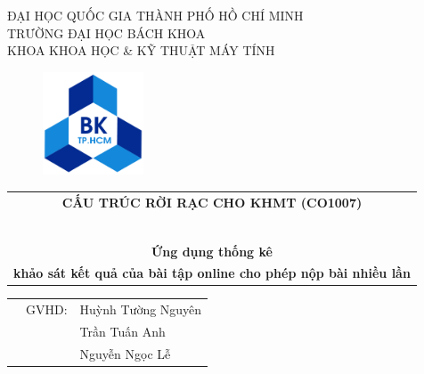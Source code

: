 \documentclass[a4paper]{article}
\theoremstyle{definition}
\begin{document}
\begin{titlepage}
\begin{center}
ĐẠI HỌC QUỐC GIA THÀNH PHỐ HỒ CHÍ MINH \\
TRƯỜNG ĐẠI HỌC BÁCH KHOA \\
KHOA KHOA HỌC \& KỸ THUẬT MÁY TÍNH 
\end{center}

\vspace{1cm}

\begin{figure}[h!]
\begin{center}
\includegraphics[width=3cm]{Images/hcmut.png}
\end{center}
\end{figure}

\vspace{1cm}


\begin{center}
\begin{tabular}{c}
\multicolumn{1}{c}{\textbf{{\Large CẤU TRÚC RỜI RẠC CHO KHMT (CO1007)}}}\\
~~\\
\hline
\\
\textbf{\large Ứng dụng thống kê} \\
\textbf{\large khảo sát kết quả của bài tập online cho phép nộp bài nhiều lần}
\\
\hline
\end{tabular}
\end{center}

\vspace{1.5cm}

\begin{table}[h]
\begin{tabular}{rrl}
\hspace{5 cm} & GVHD: & Huỳnh Tường Nguyên\\
\hspace{5 cm} &  & Trần Tuấn Anh\\
\hspace{5 cm} &  & Nguyễn Ngọc Lễ\\


\end{tabular}
\end{table}
\end{titlepage}
\end{document}
